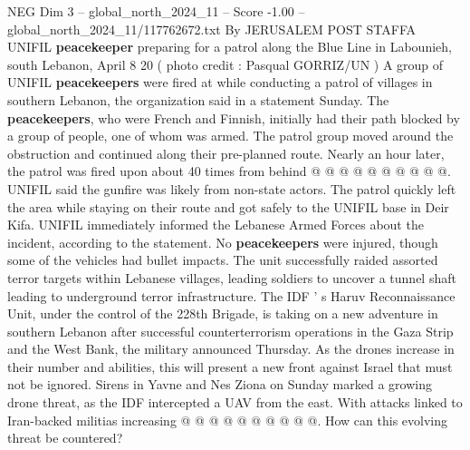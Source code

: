 \begin{textsample}{NEG Dim 3 – global\_north\_2024\_11 – Score -1.00 – global\_north\_2024\_11/117762672.txt}
By JERUSALEM POST STAFFA UNIFIL \textbf{peacekeeper} preparing for a patrol along the Blue Line in Labounieh, south Lebanon, April 8 20 ( photo credit : Pasqual GORRIZ/UN ) A group of UNIFIL \textbf{peacekeepers} were fired at while conducting a patrol of villages in southern Lebanon, the organization said in a statement Sunday.
The \textbf{peacekeepers}, who were French and Finnish, initially had their path blocked by a group of people, one of whom was armed.
The patrol group moved around the obstruction and continued along their pre-planned route.
Nearly an hour later, the patrol was fired upon about 40 times from behind @ @ @ @ @ @ @ @ @ @.
UNIFIL said the gunfire was likely from non-state actors.
The patrol quickly left the area while staying on their route and got safely to the UNIFIL base in Deir Kifa.
UNIFIL immediately informed the Lebanese Armed Forces about the incident, according to the statement.
No \textbf{peacekeepers} were injured, though some of the vehicles had bullet impacts.
The unit successfully raided assorted terror targets within Lebanese villages, leading soldiers to uncover a tunnel shaft leading to underground terror infrastructure.
The IDF ' s Haruv Reconnaissance Unit, under the control of the 228th Brigade, is taking on a new adventure in southern Lebanon after successful counterterrorism operations in the Gaza Strip and the West Bank, the military announced Thursday.
As the drones increase in their number and abilities, this will present a new front against Israel that must not be ignored.
Sirens in Yavne and Nes Ziona on Sunday marked a growing drone threat, as the IDF intercepted a UAV from the east.
With attacks linked to Iran-backed militias increasing @ @ @ @ @ @ @ @ @ @.
How can this evolving threat be countered?

\end{textsample}
